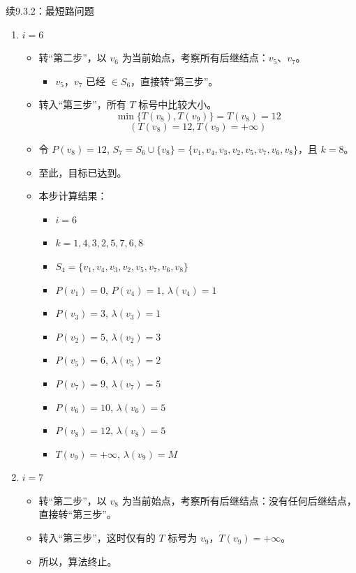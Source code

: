 \begin{exbox}{续9.3.2：最短路问题}{}
\begin{enumerate}[label=(\arabic*)]
    \item \( i = 6 \)
    \begin{itemize}
        \item 转“第二步”，以 \( v_6 \) 为当前始点，考察所有后继结点：\( v_5 \)、\( v_7 \)。
        \begin{itemize}
            \item \( v_5 \)，\( v_7 \) 已经 \( \in S_6 \)，直接转“第三步”。
        \end{itemize}
        \item 转入“第三步”，所有 \( T \) 标号中比较大小。
        \[
        \min\{T(v_8), T(v_9)\} = T(v_8) = 12
        \]
        \[
        (T(v_8) = 12, T(v_9) = +\infty)
        \]
        \item 令 \( P(v_8) = 12 \), \( S_7 = S_6 \cup \{v_8\} = \{v_1, v_4, v_3, v_2, v_5, v_7, v_6, v_8\} \)，且 \( k = 8 \)。
        \item 至此，目标已达到。
        \item 本步计算结果：
        \begin{itemize}
            \item \( i = 6 \)
            \item \( k = 1, 4, 3, 2, 5, 7, 6, 8 \)
            \item \( S_4 = \{v_1, v_4, v_3, v_2, v_5, v_7, v_6, v_8\} \)
            \item \( P(v_1) = 0 \), \( P(v_4) = 1 \), \( \lambda(v_4) = 1 \)
            \item \( P(v_3) = 3 \), \( \lambda(v_3) = 1 \)
            \item \( P(v_2) = 5 \), \( \lambda(v_2) = 3 \)
            \item \( P(v_5) = 6 \), \( \lambda(v_5) = 2 \)
            \item \( P(v_7) = 9 \), \( \lambda(v_7) = 5 \)
            \item \( P(v_6) = 10 \), \( \lambda(v_6) = 5 \)
            \item \( P(v_8) = 12 \), \( \lambda(v_8) = 5 \)
            \item \( T(v_9) = +\infty \), \( \lambda(v_9) = M \)
        \end{itemize}
    \end{itemize}

    \item \( i = 7 \)
    \begin{itemize}
        \item 转“第二步”，以 \( v_8 \) 为当前始点，考察所有后继结点：没有任何后继结点，直接转“第三步”。
        \item 转入“第三步”，这时仅有的 \( T \) 标号为 \( v_9 \)，\( T(v_9) = +\infty \)。
        \item 所以，算法终止。
    \end{itemize}


\end{enumerate}
\end{exbox}
